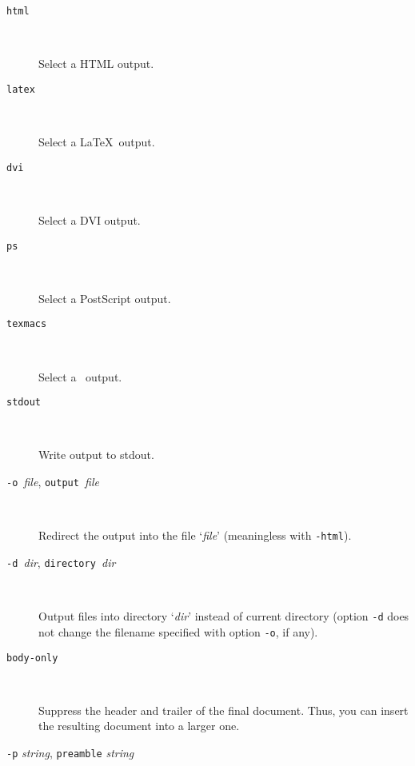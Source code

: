 \begin{description}

\item[\texttt{\mm{}html}] ~\par

  Select a HTML output.

\item[\texttt{\mm{}latex}] ~\par

  Select a \LaTeX\ output.

\item[\texttt{\mm{}dvi}] ~\par

  Select a DVI output.

\item[\texttt{\mm{}ps}] ~\par

  Select a PostScript output.

\item[\texttt{\mm{}texmacs}] ~\par

  Select a \texmacs\ output.

\item[\texttt{\mm{}stdout}] ~\par

  Write output to stdout.

\item[\texttt{-o }\textit{file}, \texttt{\mm{}output }\textit{file}] ~\par

  Redirect the output into the file `\textit{file}' (meaningless with
  \texttt{-html}).

\item[\texttt{-d }\textit{dir}, \texttt{\mm{}directory }\textit{dir}] ~\par

  Output files into directory `\textit{dir}' instead of current
  directory (option \texttt{-d} does not change the filename specified
  with option \texttt{-o}, if any).

\item[\texttt{\mm{}body-only}] ~\par

  Suppress the header and trailer of the final document. Thus, you can
  insert the resulting document into a larger one.

\item[\texttt{-p} \textit{string}, \texttt{\mm{}preamble} \textit{string}]~\par


\end{description}
